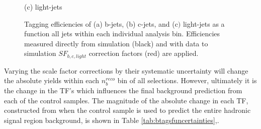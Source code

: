 \begin{figure}[ht]
\begin{minipage}[b]{0.48\linewidth}
\centering (c) light-jets
\end{minipage}
\caption[Tagging efficiencies of (a) b-jets, (b) c-jets, and (c$)$ light-jets determined from all jets within each individual analysis \theht bin. ]{Tagging efficiencies of (a) b-jets, (b) c-jets, and (c$)$ light-jets as a function all jets within each individual analysis \theht bin. Efficiencies measured directly from simulation (black) and with data to simulation $SF_{b,c,light}$ correction factors (red) are applied.}\label{fig:btagefficiency}
\end{figure}



Varying the scale factor corrections by their systematic uncertainty will change the absolute yields within  each $n_{b}^{reco}$ bin of all selections. However, ultimately it is the change in the \ac{TF}'s which influences the final background prediction from each of the control samples. The magnitude of the absolute change in each \ac{TF}, constructed from when the \mupjets control sample is used to predict the entire hadronic signal region background, is shown in Table \ref{tab:btagsfuncertainties},. 

